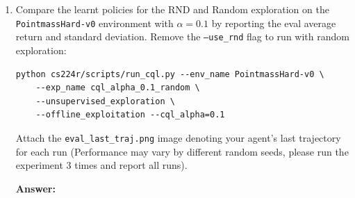 \documentclass[12pt]{article}
\newcommand{\answer}[1]{{\bf \color{red}Answer:\\ #1}}
\begin{document}
\begin{enumerate}
\item Compare the learnt policies for the RND and Random exploration on the \\ \texttt{PointmassHard-v0} environment with $\alpha=0.1$ by reporting the eval average return and standard deviation. 
Remove the \texttt{--use\_rnd} flag to run with random exploration:

\begin{tcolorbox}[width=\linewidth, sharp corners=all, colback=white!95!black]
\begin{verbatim}
python cs224r/scripts/run_cql.py --env_name PointmassHard-v0 \
    --exp_name cql_alpha_0.1_random \
    --unsupervised_exploration \
    --offline_exploitation --cql_alpha=0.1
\end{verbatim}
\end{tcolorbox}


Attach the \texttt{eval\_last\_traj.png} image denoting your agent's last trajectory for each run (Performance may vary by different random seeds, please run the experiment 3 times and report all runs).




\answer{}
\end{enumerate}
\end{document}
